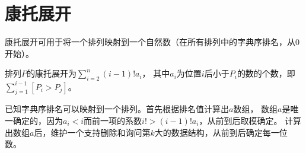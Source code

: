 \section{康托展开}
康托展开可用于将一个排列映射到一个自然数（在所有排列中的字典序排名，从0开始）。

排列$P$的康托展开为$\displaystyle \sum_{i=2}^n{(i-1)!a_i}$，
其中$a_i$为位置$i$后小于$P_i$的数的个数，即$\sum_{j=1}^{i-1}[P_i>P_j]$。

已知字典序排名可以映射到一个排列。首先根据排名值计算出$a$数组，
数组$a$是唯一确定的，因为$a_i<i$而前一项的系数$i!> (i-1)!a_i$，从前到后取模确定。
计算出数组$a$后，维护一个支持删除和询问第$k$大的数据结构，从前到后确定每一位数。

